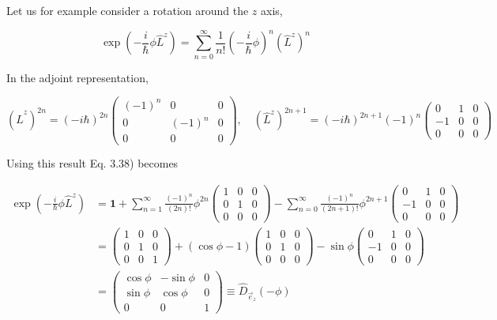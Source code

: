 \documentclass[10pt, letterpaper]{article}
\begin{document}
Let us for example consider a rotation around the $z$ axis,

$$
\exp \left(-\frac{i}{\hbar} \phi \hat{L}^{z}\right)=\sum_{n=0}^{\infty} \frac{1}{n!}\left(-\frac{i}{\hbar} \phi\right)^{n}\left(\hat{L}^{z}\right)^{n}
$$

In the adjoint representation,

$$
\left(\hat{L}^{z}\right)^{2 n}=(-i \hbar)^{2 n}\left(\begin{array}{ccc}
(-1)^{n} & 0 & 0 \\
0 & (-1)^{n} & 0 \\
0 & 0 & 0
\end{array}\right), \quad\left(\hat{L}^{z}\right)^{2 n+1}=(-i \hbar)^{2 n+1}(-1)^{n}\left(\begin{array}{ccc}
0 & 1 & 0 \\
-1 & 0 & 0 \\
0 & 0 & 0
\end{array}\right)
$$

Using this result Eq. 3.38) becomes

$$
\begin{aligned}
\exp \left(-\frac{i}{\hbar} \phi \hat{L}^{z}\right) & =\mathbf{1}+\sum_{n=1}^{\infty} \frac{(-1)^{n}}{(2 n)!} \phi^{2 n}\left(\begin{array}{lll}
1 & 0 & 0 \\
0 & 1 & 0 \\
0 & 0 & 0
\end{array}\right)-\sum_{n=0}^{\infty} \frac{(-1)^{n}}{(2 n+1)!} \phi^{2 n+1}\left(\begin{array}{ccc}
0 & 1 & 0 \\
-1 & 0 & 0 \\
0 & 0 & 0
\end{array}\right) \\
& =\left(\begin{array}{lll}
1 & 0 & 0 \\
0 & 1 & 0 \\
0 & 0 & 1
\end{array}\right)+(\cos \phi-1)\left(\begin{array}{lll}
1 & 0 & 0 \\
0 & 1 & 0 \\
0 & 0 & 0
\end{array}\right)-\sin \phi\left(\begin{array}{ccc}
0 & 1 & 0 \\
-1 & 0 & 0 \\
0 & 0 & 0
\end{array}\right) \\
& =\left(\begin{array}{ccc}
\cos \phi & -\sin \phi & 0 \\
\sin \phi & \cos \phi & 0 \\
0 & 0 & 1
\end{array}\right) \equiv \hat{D}_{\vec{e}_{z}}(-\phi)
\end{aligned}
$$
\end{document}
